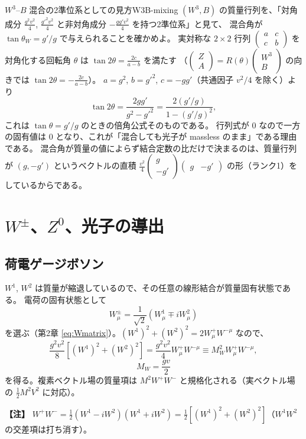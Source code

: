 \documentclass[uplatex,dvipdfmx,a4paper,11pt,openany]{jsbook}
\newenvironment{note}{\vspace{1ex}\par\footnotesize\noindent\textbf{【注】}}{\par\vspace{1ex}}
\numberwithin{equation}{chapter}
\theoremstyle{definition}
\theoremstyle{plain}
\theoremstyle{remark}
\begin{document}
\begin{myex}{$W^3$--$B$ 混合の2準位系としての見方}{W3B-mixing}
$(W^3,B)$ の質量行列を、「対角成分 $\frac{g^2v^2}{4}$, $\frac{g'^2v^2}{4}$ と非対角成分 $-\frac{gg'v^2}{4}$ を持つ2準位系」と見て、
混合角が $\tan\theta_W=g'/g$ で与えられることを確かめよ。
\tcblower
実対称な $2\times2$ 行列 $\begin{pmatrix}a&c\\ c&b\end{pmatrix}$ を対角化する回転角 $\theta$ は $\tan2\theta=\frac{2c}{a-b}$ を満たす
（$\begin{pmatrix}Z\\A\end{pmatrix}=R(\theta)\begin{pmatrix}W^3\\B\end{pmatrix}$ の向きでは $\tan2\theta=-\frac{2c}{a-b}$）。
$a=g^2$, $b=g'^2$, $c=-gg'$（共通因子 $v^2/4$ を除く）より
\[
\tan2\theta=\frac{2gg'}{g^2-g'^2}=\frac{2(g'/g)}{1-(g'/g)^2},
\]
これは $\tan\theta=g'/g$ のときの倍角公式そのものである。
行列式が 0 なので一方の固有値は 0 となり、これが「混合しても光子が massless のまま」である理由である。
混合角が質量の値によらず結合定数の比だけで決まるのは、質量行列が $(g,-g')$ というベクトルの直積
$\frac{v^2}{4}\begin{pmatrix}g\\-g'\end{pmatrix}\begin{pmatrix}g&-g'\end{pmatrix}$ の形（ランク1）をしているからである。
\end{myex}
\section{$W^\pm$、$Z^0$、光子の導出}
\label{sec:W-Z-photon}
\subsection{荷電ゲージボソン}
$W^1$, $W^2$ は質量が縮退しているので、その任意の線形結合が質量固有状態である。
電荷の固有状態として
\begin{equation}
W^\pm_\mu=\frac{1}{\sqrt2}\left(W^1_\mu\mp iW^2_\mu\right)
\label{eq:Wpm}
\end{equation}
を選ぶ（第2章 \eqref{eq:Wmatrix}）。$(W^1)^2+(W^2)^2=2W^+_\mu W^{-\mu}$ なので、
\begin{equation}
\frac{g^2v^2}{8}\left[(W^1)^2+(W^2)^2\right]=\frac{g^2v^2}{4}W^+_\mu W^{-\mu}\equiv M_W^2W^+_\mu W^{-\mu},
\end{equation}
\begin{equation}
\boxed{M_W=\frac{gv}{2}}
\label{eq:MW}
\end{equation}
を得る。複素ベクトル場の質量項は $M^2W^+W^-$ と規格化される（実ベクトル場の $\frac12M^2V^2$ に対応）。
\begin{note}
$W^+W^-=\frac12(W^1-iW^2)(W^1+iW^2)=\frac12\left[(W^1)^2+(W^2)^2\right]$（$W^1W^2$ の交差項は打ち消す）。
\end{note}
\end{document}
